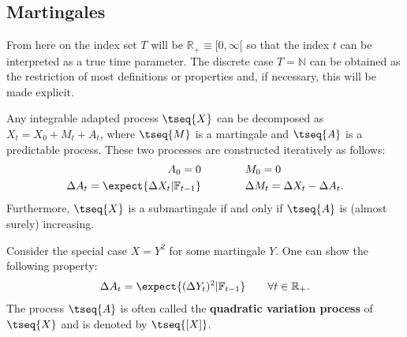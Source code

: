 \subsection{Martingales}

    From here on the index set $T$ will be $\mathbb{R}_+\equiv[0,\infty[$ so that the index $t$ can be interpreted as a true time parameter. The discrete case $T=\mathbb{N}$ can be obtained as the restriction of most definitions or properties and, if necessary, this will be made explicit.


    \begin{theorem}
        Any integrable adapted process $\tseq{X}$ can be decomposed as $X_t=X_0+M_t+A_t$, where $\tseq{M}$ is a martingale and $\tseq{A}$ is a predictable process. These two processes are constructed iteratively as follows:
        \begin{align}
            A_0 = 0\qquad&\qquad M_0 = 0\\
            \Delta A_t = \expect{\Delta X_t|\mathbb{F}_{t-1}}\qquad&\qquad\Delta M_t = \Delta X_t - \Delta A_t.
        \end{align}
        Furthermore, $\tseq{X}$ is a submartingale if and only if $\tseq{A}$ is (almost surely) increasing.
    \end{theorem}
    \begin{result}
        Consider the special case $X=Y^2$ for some martingale $Y$. One can show the following property:
        \begin{gather}
            \Delta A_t = \expect{(\Delta Y_t)^2|\mathbb{F}_{t-1}}\qquad\forall t\in\mathbb{R}_+.
        \end{gather}
        The process $\tseq{A}$ is often called the \textbf{quadratic variation process} of $\tseq{X}$ and is denoted by $\tseq{[X]}$.
    \end{result}

